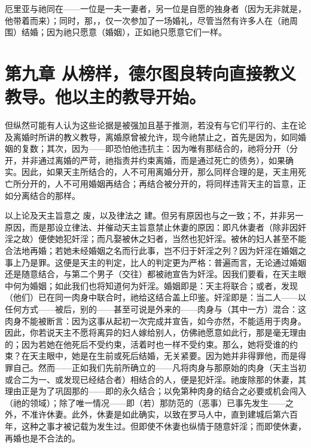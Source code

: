 {厄里亚}与祂同在——一位是一夫一妻者，另一位是自愿的独身者（因为无非就是，他带着而来）；同时，那，，仅一次参加了一场婚礼，尽管当然有许多人在（祂周围）结婚；因为祂只愿意（婚姻），正如祂只愿意它们一样。\par


\section{第九章 从榜样，德尔图良转向直接教义教导。他以主的教导开始。}

但纵然可能有人认为这些论据是被强加且基于推测，若没有与它们平行的、主在论及离婚时所讲的教义教导，离婚原曾被允许，现今祂禁止之，首先是因为，如同婚姻的复数；其次，因为——即恐怕他违抗主：因为唯有那结合的，祂将分开（分开，并非通过离婚的严苛，祂指责并约束离婚，而是通过死亡的债务），如果确实。因此，如果天主所结合的，人不可用离婚分开，那么同样合理的是，天主用死亡所分开的，人不可用婚姻再结合；再结合被分开的，将同样违背天主的旨意，正如分离结合的那样。\par

以上论及天主旨意之 废，以及律法之 建。但另有原因也与之一致；不，并非另一原因，而是那设立律法、并催动天主旨意禁止休妻的原因：即凡休妻者（除非因奸淫之故）便使她犯奸淫；而凡娶被休之妇者，当然也犯奸淫。被休的妇人甚至不能合法地再婚；若她未经婚姻之名而行此事，岂不归于奸淫之列？因为奸淫在婚姻之事上乃是罪。这便是天主的判定，比人的判定更为严格：普遍而言，无论通过婚姻还是随意结合，与第二个男子（交往）都被祂宣告为奸淫。因我们要看，在天主眼中何为婚姻；如此我们也将知道何为奸淫。婚姻即是：天主将联合；或者，发现（他们）已在同一肉身中联合时，祂给这结合盖上印鉴。奸淫即是：当二人——以任何方式——被后，别的——甚至可说是外来的——肉身与（其中一方）混合：这肉身不能被断言：因为这事从起初一次完成并宣告，如今亦然，不能适用于肉身。因此，你若说天主不愿将离异的妇人嫁给别人，仿佛祂愿意如此行，那是毫无理由的；因为若她在他死后不受约束，活着时也一样不受约束。那么，她将受谁的约束？在天主眼中，她是在生前或死后结婚，无关紧要。因为她并非得罪他，而是得罪自己。然而——正如我们先前所确立的——凡将肉身与那原始的肉身（天主当初或合二为一、或发现已经结合者）相结合的人，便是犯奸淫。祂废除那的休妻，其理由正是为了巩固那的——即的永久结合；以免第种肉身的结合之必要或机会闯入（祂的领域）；除了唯一情况——即（若）那防范的（恶事）已事先发生——之外，不准许休妻。此外，休妻是如此确实，以致在罗马人中，直到建城后第六百年，这种之事才被记载为发生过。但即使不休妻也纵情于随意奸淫；而即使休妻，再婚也是不合法的。\par

